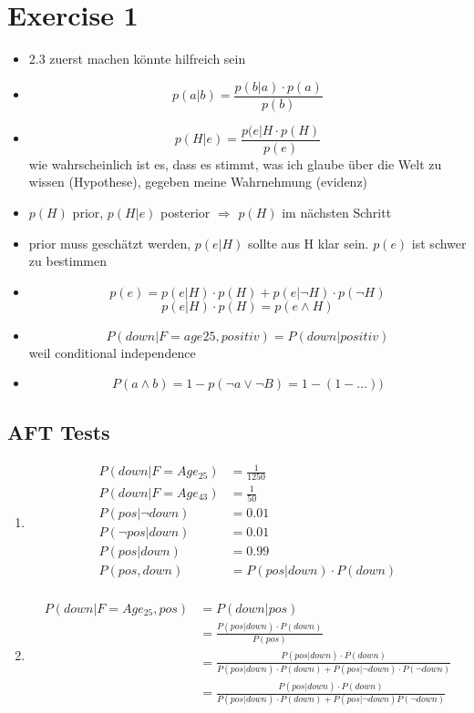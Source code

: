 \documentclass[fleqn,12pt]{scrartcl}
\newcommand{\blattn}{Exercise 1}
\begin{document}
\section*{\blattn}
\setcounter{section}{1}
\begin{itemize}
	\item
2.3 zuerst machen könnte hilfreich sein
\item
$$
p(a|b) = \frac{p(b|a)\cdot p(a)}{p(b)}
$$

\item
$$p(H|e) = \frac{p(e|H \cdot p(H)}{p(e)}
$$
wie wahrscheinlich ist es, dass es stimmt, was ich glaube über die Welt zu wissen (Hypothese), gegeben meine Wahrnehmung (evidenz)

\item
$p(H)$ prior, $p(H|e)$ posterior $\Rightarrow$ $p(H)$ im nächsten Schritt

\item
prior muss geschätzt werden, $p(e|H)$ sollte aus H klar sein. $p(e)$ ist schwer zu bestimmen
\item
	$$p(e) = p(e|H) \cdot p(H) + p(e|\neg H) \cdot p(\neg H)$$
	$$p(e|H) \cdot p(H) = p(e\wedge H)$$
\item
	$$P(down | F=age25, positiv) = P(down | positiv)$$ weil conditional independence
\item
	$$P(a\wedge b) = 1 - p(\neg a \vee \neg B) = 1 - (1 -  \dots ) )$$
\end{itemize}

\subsection{AFT Tests}

\begin{enumerate}
	\item
\begin{align*}
	P(down | F=Age_{25}) &= \frac1{1250}\\
	P(down | F=Age_{43}) &= \frac1{50}\\
	P(pos | \neg down) &= 0.01\\
	P(\neg pos | down) &= 0.01\\
	P(pos | down) &= 0.99\\
	P(pos, down) &= P(pos | down) \cdot P(down)\\
\end{align*}
\item
	\begin{align*}
		P(down | F=Age_{25}, pos) &= P(down | pos) \\
																											 &= \frac{P(pos|down)\cdot P(down)}{P(pos)}\\
				 &= \frac{P(pos|down)\cdot P(down)}{P(pos|down)\cdot P(down) + P(pos| \neg down) \cdot P(\neg down)}\\
																&= \frac{P(pos|down)\cdot P(down)}{P(pos|down)\cdot P(down) + P(pos| \neg down) P(\neg down)}\\
	\end{align*}

\end{enumerate}
\end{document}

